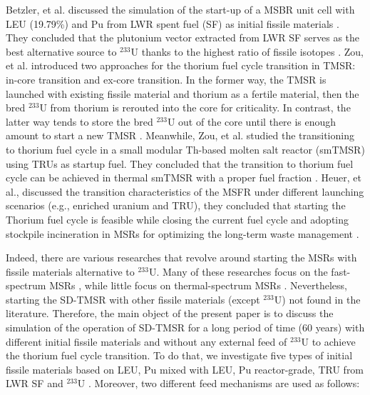 Betzler, et al. discussed the simulation of the start-up of a MSBR unit cell with LEU (19.79\%) and Pu from \gls{LWR} spent fuel (SF) as initial fissile materials \cite{betzler2016modeling}. They concluded that the plutonium vector extracted from LWR SF serves as the best alternative source to $^{233}$U thanks to the highest ratio of fissile isotopes \cite{betzler2016modeling}. Zou, et al. introduced two approaches for the thorium fuel cycle transition in \gls{TMSR}: in-core transition and ex-core transition. In the former way, the TMSR is launched with existing fissile material and thorium as a fertile material, then the bred $^{233}$U from thorium is rerouted into the core for criticality. In contrast, the latter way tends to store the bred $^{233}$U out of the core until there is enough amount to start a new TMSR \cite{zou2018transition}.
Meanwhile, Zou, et al. studied the transitioning to thorium fuel cycle in a small modular Th-based molten salt reactor (smTMSR) using TRUs as startup fuel. They concluded that the transition to thorium fuel cycle can be achieved in thermal smTMSR with a proper fuel fraction \cite{zou2018preliminary}.
Heuer, et al., discussed the transition characteristics of the \gls{MSFR} under different launching scenarios (e.g., enriched uranium and TRU), they concluded that starting the Thorium fuel cycle is feasible while closing the current fuel cycle and adopting stockpile incineration in MSRs for optimizing the long-term waste management \cite{heuer2014towards}.

Indeed, there are various researches that revolve around starting the MSRs with fissile materials alternative to $^{233}$U. Many of these researches focus on the fast-spectrum MSRs \cite{ashraf2019modeling,ashraf2018nuclear,heuer2014towards,fiorina2013investigation}, while little focus on thermal-spectrum MSRs \cite{betzler2016modeling,zou2018preliminary,zou2018transition}. Nevertheless, starting the \gls{SD-TMSR} with other fissile materials (except $^{233}$U) not found in the literature. Therefore, the main object of the present paper is to discuss the simulation of the operation of \gls{SD-TMSR} for a long period of time (60 years) with different initial fissile materials and without any external feed of $^{233}$U to achieve the thorium fuel cycle transition. To do that, we investigate five types of initial fissile materials based on \gls{LEU}, Pu mixed with \gls{LEU}, Pu reactor-grade, \gls{TRU} from LWR SF and $^{233}$U \cite{de2000scenarios}. Moreover, two different feed mechanisms are used as follows:

